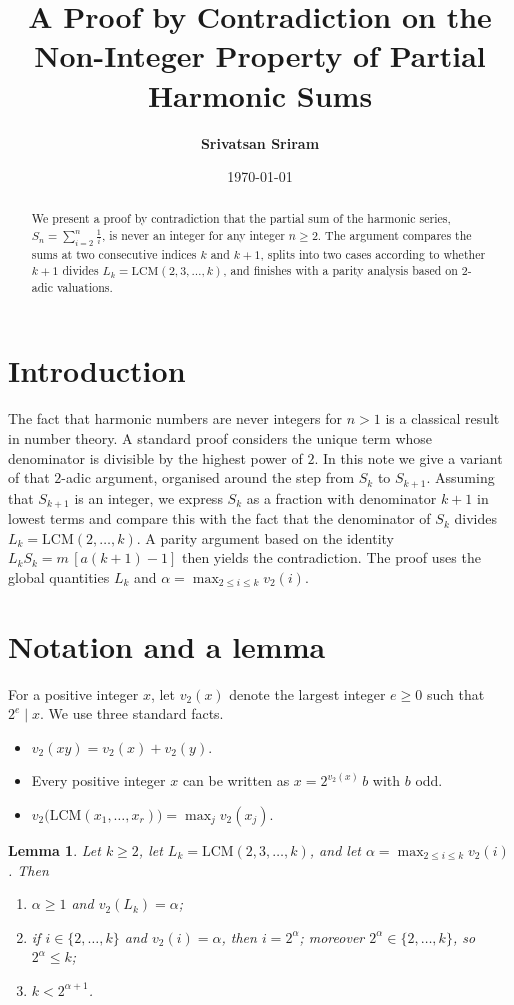 \documentclass[11pt,a4paper]{article}
\title{\textbf{A Proof by Contradiction on the Non-Integer Property of Partial Harmonic Sums}}
\author{\textbf{Srivatsan Sriram}}
\date{\today}
\newtheorem{lemma}{Lemma}
\begin{document}
\maketitle

\begin{abstract}
We present a proof by contradiction that the partial sum of the harmonic series, $S_n = \sum_{i=2}^{n} \frac{1}{i}$, is never an integer for any integer $n \geq 2$. The argument compares the sums at two consecutive indices $k$ and $k+1$, splits into two cases according to whether $k+1$ divides $L_k = \mathrm{LCM}(2,3,\dots,k)$, and finishes with a parity analysis based on $2$-adic valuations.
\end{abstract}

\section{Introduction}
The fact that harmonic numbers are never integers for $n > 1$ is a classical result in number theory. A standard proof considers the unique term whose denominator is divisible by the highest power of $2$. In this note we give a variant of that $2$-adic argument, organised around the step from $S_k$ to $S_{k+1}$. Assuming that $S_{k+1}$ is an integer, we express $S_k$ as a fraction with denominator $k+1$ in lowest terms and compare this with the fact that the denominator of $S_k$ divides $L_k = \mathrm{LCM}(2,\dots,k)$. A parity argument based on the identity $L_k S_k = m\,[a(k+1)-1]$ then yields the contradiction. The proof uses the global quantities $L_k$ and $\alpha = \max_{2\le i\le k} v_2(i)$.

\section{Notation and a lemma}

For a positive integer $x$, let $v_2(x)$ denote the largest integer $e \ge 0$ such that $2^e \mid x$. We use three standard facts.
\begin{itemize}
    \item[(V1)] $v_2(xy) = v_2(x) + v_2(y)$.
    \item[(V2)] Every positive integer $x$ can be written as $x = 2^{v_2(x)}\, b$ with $b$ odd.
    \item[(V3)] $v_2\big(\mathrm{LCM}(x_1,\dots,x_r)\big) = \max_j v_2(x_j)$.
\end{itemize}

\begin{lemma}\label{lem:alpha}
Let $k \ge 2$, let $L_k = \mathrm{LCM}(2,3,\dots,k)$, and let $\alpha = \max_{2\le i\le k} v_2(i)$. Then
\begin{enumerate}
    \item[(a)] $\alpha \ge 1$ and $v_2(L_k) = \alpha$;
    \item[(b)] if $i \in \{2,\dots,k\}$ and $v_2(i) = \alpha$, then $i = 2^\alpha$; moreover $2^\alpha \in \{2,\dots,k\}$, so $2^\alpha \le k$;
    \item[(c)] $k < 2^{\alpha+1}$.
\end{enumerate}
\end{lemma}
\end{document}
